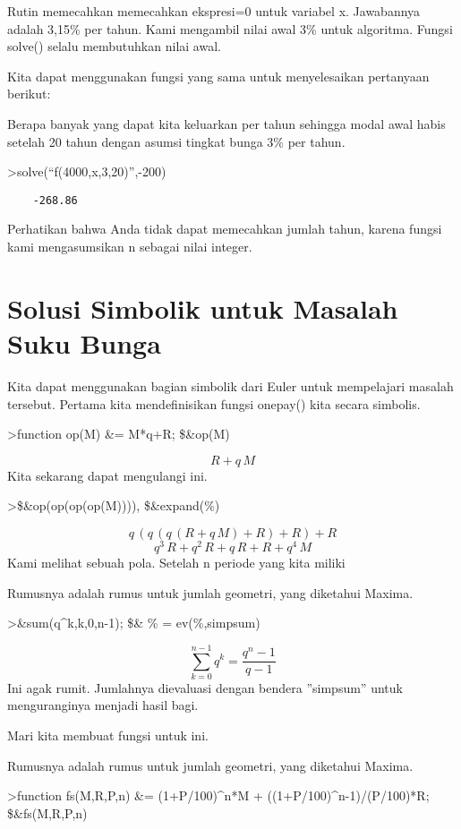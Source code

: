 \documentclass[
]{book}
\begin{document}
Rutin memecahkan memecahkan ekspresi=0 untuk variabel x. Jawabannya adalah 3,15\% per tahun. Kami mengambil nilai awal 3\% untuk algoritma. Fungsi solve() selalu membutuhkan nilai awal.

Kita dapat menggunakan fungsi yang sama untuk menyelesaikan pertanyaan berikut:

Berapa banyak yang dapat kita keluarkan per tahun sehingga modal awal habis setelah 20 tahun dengan asumsi tingkat bunga 3\% per tahun.

\textgreater solve(``f(4000,x,3,20)'',-200)

\begin{verbatim}
    -268.86 
\end{verbatim}

Perhatikan bahwa Anda tidak dapat memecahkan jumlah tahun, karena fungsi kami mengasumsikan n sebagai nilai integer.

\section{Solusi Simbolik untuk Masalah Suku Bunga}\label{solusi-simbolik-untuk-masalah-suku-bunga}

Kita dapat menggunakan bagian simbolik dari Euler untuk mempelajari masalah tersebut. Pertama kita mendefinisikan fungsi onepay() kita secara simbolis.

\textgreater function op(M) \&= M*q+R; \$\&op(M)

\[R+q\,M\]Kita sekarang dapat mengulangi ini.

\textgreater\$\&op(op(op(op(M)))), \$\&expand(\%)

\[q\,\left(q\,\left(q\,\left(R+q\,M\right)+R\right)+R\right)+R\]\[q^3\,R+q^2\,R+q\,R+R+q^4\,M\]Kami melihat sebuah pola. Setelah n periode yang kita miliki

Rumusnya adalah rumus untuk jumlah geometri, yang diketahui Maxima.

\textgreater\&sum(q\^{}k,k,0,n-1); \$\& \% = ev(\%,simpsum)

\[\sum_{k=0}^{n-1}{q^{k}}=\frac{q^{n}-1}{q-1}\]Ini agak rumit. Jumlahnya dievaluasi dengan bendera ''simpsum'' untuk menguranginya menjadi hasil bagi.

Mari kita membuat fungsi untuk ini.

Rumusnya adalah rumus untuk jumlah geometri, yang diketahui Maxima.

\textgreater function fs(M,R,P,n) \&= (1+P/100)\^{}n*M + ((1+P/100)\^{}n-1)/(P/100)*R; \$\&fs(M,R,P,n)
\end{document}
